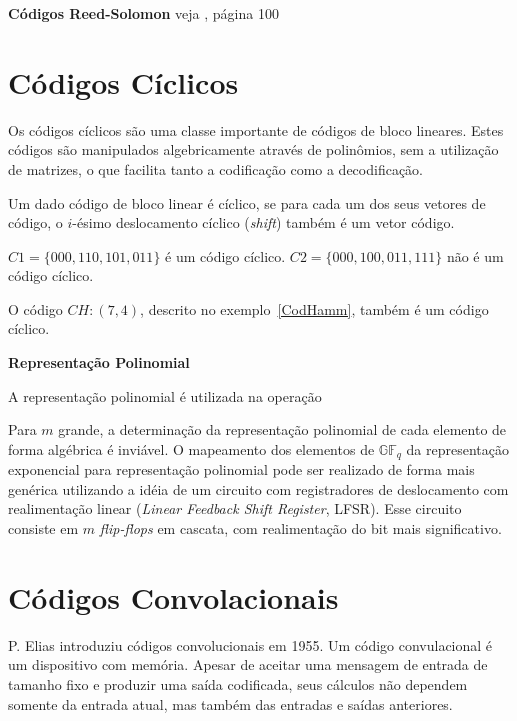 \begin{example} {\bf Códigos Reed-Solomon} veja \cite{Hefez:2008}, página 100
\end{example}

\section{Códigos Cíclicos}

Os códigos cíclicos são uma classe importante de códigos de bloco lineares. Estes códigos são manipulados algebricamente através de polinômios, sem a utilização de matrizes, o que facilita tanto a codificação como a decodificação.

\begin{definition} Um dado código de bloco linear é cíclico, se para cada um dos seus vetores de código, o $i$-ésimo deslocamento cíclico (\emph{shift}) também é um vetor código.
\end{definition}

\begin{example}
$C1 = \{000, 110, 101, 011\}$ é um código cíclico. $C2 = \{000, 100, 011, 111\}$ não é um código cíclico.

O código $CH:(7,4)$, descrito no exemplo~\ref{CodHamm}, também é um código cíclico.
\end{example}

\begin{definition} {\bf Representação Polinomial} \label{RepPol}  
\end{definition}

A representação polinomial é utilizada na operação 

Para $m$ grande, a determinação da representação polinomial de cada elemento de forma algébrica é inviável. O mapeamento dos elementos de $\mathbb{GF}_q$ da representação exponencial para representação polinomial pode ser realizado de forma mais genérica utilizando a idéia de um circuito com registradores de deslocamento com realimentação linear (\emph{Linear Feedback Shift Register}, LFSR). Esse circuito consiste em $m$ \emph{flip-flops} em cascata, com realimentação do bit mais significativo. 

\section{Códigos Convolacionais}

P. Elias introduziu códigos convolucionais em 1955. Um código convulacional é um dispositivo com memória. Apesar de aceitar uma mensagem de entrada de tamanho fixo e produzir uma saída codificada, seus cálculos não dependem somente da entrada atual, mas também das entradas e saídas anteriores.

